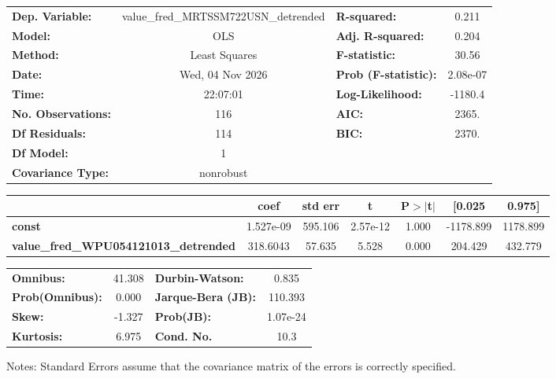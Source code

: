 \begin{center}
\begin{tabular}{lclc}
\toprule
\textbf{Dep. Variable:}                       & value\_fred\_MRTSSM722USN\_detrended & \textbf{  R-squared:         } &     0.211   \\
\textbf{Model:}                               &                 OLS                  & \textbf{  Adj. R-squared:    } &     0.204   \\
\textbf{Method:}                              &            Least Squares             & \textbf{  F-statistic:       } &     30.56   \\
\textbf{Date:}                                &           Wed, 04 Nov 2026           & \textbf{  Prob (F-statistic):} &  2.08e-07   \\
\textbf{Time:}                                &               22:07:01               & \textbf{  Log-Likelihood:    } &   -1180.4   \\
\textbf{No. Observations:}                    &                   116                & \textbf{  AIC:               } &     2365.   \\
\textbf{Df Residuals:}                        &                   114                & \textbf{  BIC:               } &     2370.   \\
\textbf{Df Model:}                            &                     1                & \textbf{                     } &             \\
\textbf{Covariance Type:}                     &              nonrobust               & \textbf{                     } &             \\
\bottomrule
\end{tabular}
\begin{tabular}{lcccccc}
                                              & \textbf{coef} & \textbf{std err} & \textbf{t} & \textbf{P$> |$t$|$} & \textbf{[0.025} & \textbf{0.975]}  \\
\midrule
\textbf{const}                                &    1.527e-09  &      595.106     &  2.57e-12  &         1.000        &    -1178.899    &     1178.899     \\
\textbf{value\_fred\_WPU054121013\_detrended} &     318.6043  &       57.635     &     5.528  &         0.000        &      204.429    &      432.779     \\
\bottomrule
\end{tabular}
\begin{tabular}{lclc}
\textbf{Omnibus:}       & 41.308 & \textbf{  Durbin-Watson:     } &    0.835  \\
\textbf{Prob(Omnibus):} &  0.000 & \textbf{  Jarque-Bera (JB):  } &  110.393  \\
\textbf{Skew:}          & -1.327 & \textbf{  Prob(JB):          } & 1.07e-24  \\
\textbf{Kurtosis:}      &  6.975 & \textbf{  Cond. No.          } &     10.3  \\
\bottomrule
\end{tabular}
\end{center}

Notes: \newline
 [1] Standard Errors assume that the covariance matrix of the errors is correctly specified.